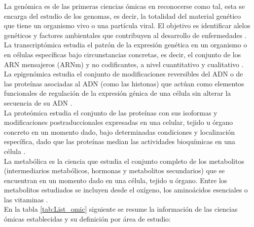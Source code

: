 La genómica es de las primeras ciencias ómicas en reconocerse como tal, esta se encarga del estudio de los genomas, es decir, la totalidad del material genético que tiene un organismo vivo o una partícula viral. El objetivo es identificar alelos genéticos y factores ambientales que contribuyen al desarrollo de enfermedades \citep{institute}.\\

La transcriptómica estudia el patrón de la expresión genética en un organismo o en células específicas bajo circunstancias concretas, es decir, el conjunto de los ARN mensajeros (ARNm) y no codificantes, a nivel cuantitativo y cualitativo \citep{davis2017missing}.\\

La epigenómica estudia el conjunto de modificaciones reversibles del ADN o de las proteínas asociadas al ADN (como las histonas) que actúan como elementos funcionales de regulación de la expresión génica de una célula sin alterar la secuencia de su ADN \citep{hasin2017multi}.\\

La proteómica estudia el conjunto de las proteínas con sus isoformas y modificaciones postraduccionales expresadas en una celular, tejido u órgano concreto en un momento dado, bajo determinadas condiciones y localización específica, dado que las proteínas median las actividades bioquímicas en una célula \citep{van2018precision}.\\

La metabólica es la ciencia que estudia el conjunto completo de los metabolitos (intermediarios metabólicos, hormonas y metabolitos secundarios) que se encuentran en un momento dado en una célula, tejido u órgano. Entre los metabolitos estudiados se incluyen desde el oxígeno, los aminoácidos esenciales o las vitaminas \citep{zhao2014lipidomics}.\\

En la tabla \ref{tab:List_omic} siguiente se resume la información de las ciencias ómicas establecidas y su definición por área de estudio:

